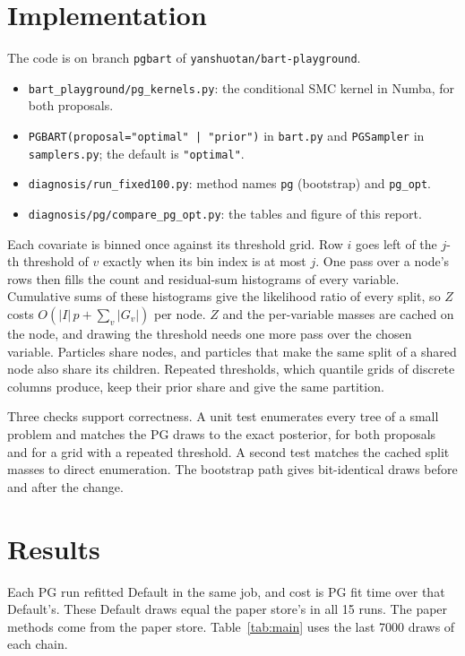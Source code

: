 \documentclass[11pt]{article}
\begin{document}
\section{Implementation}

The code is on branch \texttt{pgbart} of \texttt{yanshuotan/bart-playground}.
\begin{itemize}
  \item \texttt{bart\_playground/pg\_kernels.py}: the conditional SMC kernel in Numba, for both proposals.
  \item \texttt{PGBART(proposal="optimal" | "prior")} in \texttt{bart.py} and \texttt{PGSampler} in \texttt{samplers.py}; the default is \texttt{"optimal"}.
  \item \texttt{diagnosis/run\_fixed100.py}: method names \texttt{pg} (bootstrap) and \texttt{pg\_opt}.
  \item \texttt{diagnosis/pg/compare\_pg\_opt.py}: the tables and figure of this report.
\end{itemize}
Each covariate is binned once against its threshold grid.
Row $i$ goes left of the $j$-th threshold of $v$ exactly when its bin index is at most $j$.
One pass over a node's rows then fills the count and residual-sum histograms of every variable.
Cumulative sums of these histograms give the likelihood ratio of every split, so $Z$ costs $O(|I|\,p + \sum_v |G_v|)$ per node.
$Z$ and the per-variable masses are cached on the node, and drawing the threshold needs one more pass over the chosen variable.
Particles share nodes, and particles that make the same split of a shared node also share its children.
Repeated thresholds, which quantile grids of discrete columns produce, keep their prior share and give the same partition.

Three checks support correctness.
A unit test enumerates every tree of a small problem and matches the PG draws to the exact posterior, for both proposals and for a grid with a repeated threshold.
A second test matches the cached split masses to direct enumeration.
The bootstrap path gives bit-identical draws before and after the change.

\section{Results}

Each PG run refitted Default in the same job, and cost is PG fit time over that Default's.
These Default draws equal the paper store's in all 15 runs.
The paper methods come from the paper store.
Table~\ref{tab:main} uses the last 7000 draws of each chain.
\end{document}
